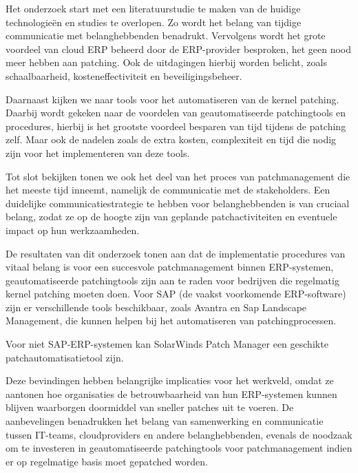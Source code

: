 Het onderzoek start met een literatuurstudie te maken van de huidige technologieën en studies te overlopen. Zo wordt het belang van tijdige communicatie met belanghebbenden benadrukt. Vervolgens wordt het grote voordeel van cloud ERP beheerd door de ERP-provider besproken, het geen nood meer hebben aan patching. Ook de uitdagingen hierbij worden belicht, zoals schaalbaarheid, kosteneffectiviteit en beveiligingsbeheer.

Daarnaast kijken we naar tools voor het automatiseren van de kernel patching. Daarbij wordt gekeken naar de voordelen van geautomatiseerde patchingtools en procedures, hierbij is het grootste voordeel besparen van tijd tijdens de patching zelf. Maar ook de nadelen zoals de extra kosten, complexiteit en tijd die nodig zijn voor het implementeren van deze tools.

Tot slot bekijken tonen we ook het deel van het proces van patchmanagement die het meeste tijd inneemt, namelijk de communicatie met de stakeholders. Een duidelijke communicatiestrategie te hebben voor belanghebbenden is van cruciaal belang, zodat ze op de hoogte zijn van geplande patchactiviteiten en eventuele impact op hun werkzaamheden.

De resultaten van dit onderzoek tonen aan dat de implementatie procedures van vitaal belang is voor een succesvole patchmanagement binnen ERP-systemen, geautomatiseerde patchingtools zijn aan te raden voor bedrijven die regelmatig kernel patching moeten doen. Voor SAP (de vaakst voorkomende ERP-software) zijn er verschillende tools beschikbaar, zoals Avantra en Sap Landscape Management, die kunnen helpen bij het automatiseren van patchingprocessen. 

Voor niet SAP-ERP-systemen kan SolarWinds Patch Manager een geschikte patchautomatisatietool zijn.

Deze bevindingen hebben belangrijke implicaties voor het werkveld, omdat ze aantonen hoe organisaties de betrouwbaarheid van hun ERP-systemen kunnen blijven waarborgen doormiddel van sneller patches uit te voeren. De aanbevelingen benadrukken het belang van samenwerking en communicatie tussen IT-teams, cloudproviders en andere belanghebbenden, evenals de noodzaak om te investeren in geautomatiseerde patchingtools voor patchmanagement indien er op regelmatige basis moet gepatched worden.